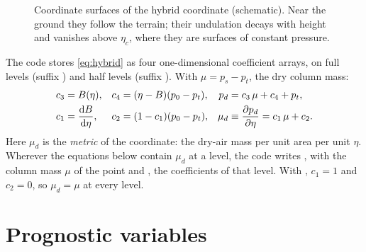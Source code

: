 \begin{figure}[ht]
\centering
{}
\caption{Coordinate surfaces of the hybrid coordinate (schematic). Near the ground they follow the terrain; their
undulation decays with height and vanishes above $\eta_c$, where they are surfaces of constant pressure.}
\label{fig:hybrid}
\end{figure}

The code stores \cref{eq:hybrid} as four one-dimensional coefficient arrays, on full levels (suffix ) and
half levels (suffix ). With $\mu = p_s - p_t$, the dry column mass:
\begin{align}
  c_3 &= B(\eta), & c_4 &= (\eta - B)(p_0 - p_t), & p_d &= c_3\,\mu + c_4 + p_t, \label{eq:c34}\\
  c_1 &= \frac{\mathrm{d}B}{\mathrm{d}\eta}, & c_2 &= (1 - c_1)(p_0 - p_t), &
  \mu_d &\equiv \frac{\partial p_d}{\partial \eta} = c_1\,\mu + c_2 . \label{eq:c12}
\end{align}
Here $\mu_d$ is the \emph{metric} of the coordinate: the dry-air mass per unit area per unit $\eta$. Wherever the
equations below contain $\mu_d$ at a level, the code writes , with  the column
mass $\mu$ of the point and ,  the coefficients of that level. With ,
$c_1 = 1$ and $c_2 = 0$, so $\mu_d = \mu$ at every level.

\section{Prognostic variables}

